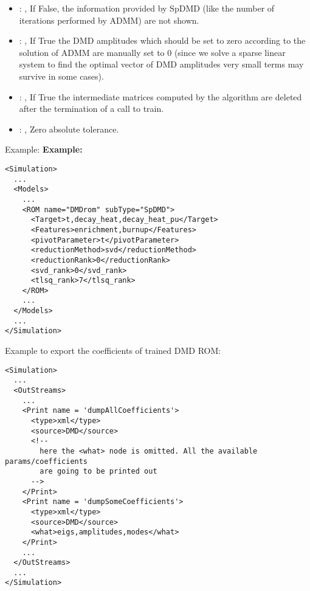 \begin{itemize}
    \item {}: ,
      If False, the information provided by SpDMD (like the number of iterations performed
      by ADMM) are not shown.

    \item {}: ,
      If True the DMD amplitudes which should be set to zero
      according to the solution of ADMM are manually set to 0 (since we
      solve a sparse linear system to find the optimal vector of DMD amplitudes
      very small terms may survive in some cases).

    \item {}: ,
      If True the intermediate matrices computed by the algorithm are deleted
      after the termination of a call to train.

    \item {}: ,
      Zero absolute tolerance.
  \end{itemize}

\hspace{24pt}
Example:
\textbf{Example:}
\begin{lstlisting}[style=XML,morekeywords={name,subType}]
<Simulation>
  ...
  <Models>
    ...
    <ROM name="DMDrom" subType="SpDMD">
      <Target>t,decay_heat,decay_heat_pu</Target>
      <Features>enrichment,burnup</Features>
      <pivotParameter>t</pivotParameter>
      <reductionMethod>svd</reductionMethod>
      <reductionRank>0</reductionRank>
      <svd_rank>0</svd_rank>
      <tlsq_rank>7</tlsq_rank>
    </ROM>
    ...
  </Models>
  ...
</Simulation>
\end{lstlisting}

Example to export the coefficients of trained DMD ROM:
\begin{lstlisting}[style=XML,morekeywords={name,subType}]
<Simulation>
  ...
  <OutStreams>
    ...
    <Print name = 'dumpAllCoefficients'>
      <type>xml</type>
      <source>DMD</source>
      <!--
        here the <what> node is omitted. All the available params/coefficients
        are going to be printed out
      -->
    </Print>
    <Print name = 'dumpSomeCoefficients'>
      <type>xml</type>
      <source>DMD</source>
      <what>eigs,amplitudes,modes</what>
    </Print>
    ...
  </OutStreams>
  ...
</Simulation>
\end{lstlisting}


